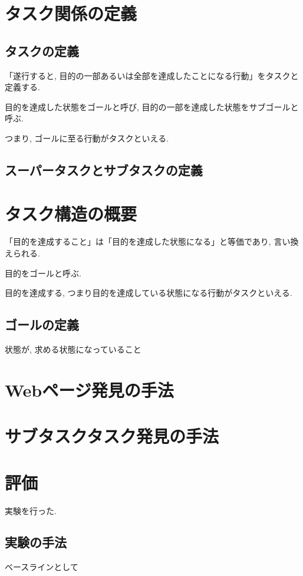 \documentclass[submit,techreq]{ipsj}
\begin{document}
\section{タスク関係の定義}

\subsection{タスクの定義}

「遂行すると, 目的の一部あるいは全部を達成したことになる行動」をタスクと定義する.

目的を達成した状態をゴールと呼び, 目的の一部を達成した状態をサブゴールと呼ぶ.

つまり, ゴールに至る行動がタスクといえる.


\subsection{スーパータスクとサブタスクの定義}


\section{タスク構造の概要}
「目的を達成すること」は「目的を達成した状態になる」と等価であり, 言い換えられる.

目的をゴールと呼ぶ.

目的を達成する, つまり目的を達成している状態になる行動がタスクといえる.


\subsection{ゴールの定義}
状態が, 求める状態になっていること


\section{Webページ発見の手法}

\section{サブタスクタスク発見の手法}

\section{評価}
実験を行った.

\subsection{実験の手法}
ベースラインとして
\end{document}
